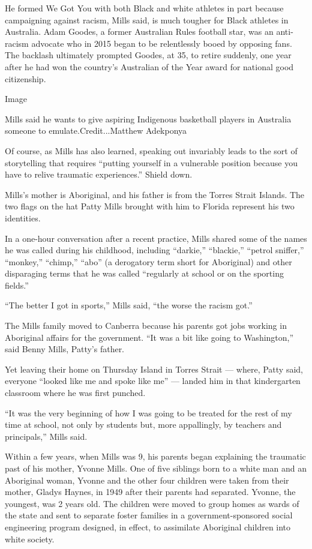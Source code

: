 He formed We Got You with both Black and white athletes in part because
campaigning against racism, Mills said, is much tougher for Black
athletes in Australia. Adam Goodes, a former Australian Rules football
star, was an anti-racism advocate who in 2015 began to be relentlessly
booed by opposing fans. The backlash ultimately prompted Goodes, at 35,
to retire suddenly, one year after he had won the country's Australian
of the Year award for national good citizenship.

Image

Mills said he wants to give aspiring Indigenous basketball players in
Australia someone to emulate.Credit...Matthew Adekponya

Of course, as Mills has also learned, speaking out invariably leads to
the sort of storytelling that requires ``putting yourself in a
vulnerable position because you have to relive traumatic experiences.''
Shield down.

Mills's mother is Aboriginal, and his father is from the Torres Strait
Islands. The two flags on the hat Patty Mills brought with him to
Florida represent his two identities.

In a one-hour conversation after a recent practice, Mills shared some of
the names he was called during his childhood, including ``darkie,''
``blackie,'' ``petrol sniffer,'' ``monkey,'' ``chimp,'' ``abo'' (a
derogatory term short for Aboriginal) and other disparaging terms that
he was called ``regularly at school or on the sporting fields.''

``The better I got in sports,'' Mills said, ``the worse the racism
got.''

The Mills family moved to Canberra because his parents got jobs working
in Aboriginal affairs for the government. ``It was a bit like going to
Washington,'' said Benny Mills, Patty's father.

Yet leaving their home on Thursday Island in Torres Strait --- where,
Patty said, everyone ``looked like me and spoke like me'' --- landed him
in that kindergarten classroom where he was first punched.

``It was the very beginning of how I was going to be treated for the
rest of my time at school, not only by students but, more appallingly,
by teachers and principals,'' Mills said.

Within a few years, when Mills was 9, his parents began explaining the
traumatic past of his mother, Yvonne Mills. One of five siblings born to
a white man and an Aboriginal woman, Yvonne and the other four children
were taken from their mother, Gladys Haynes, in 1949 after their parents
had separated. Yvonne, the youngest, was 2 years old. The children were
moved to group homes as wards of the state and sent to separate foster
families in a government-sponsored social engineering program designed,
in effect, to assimilate Aboriginal children into white society.

